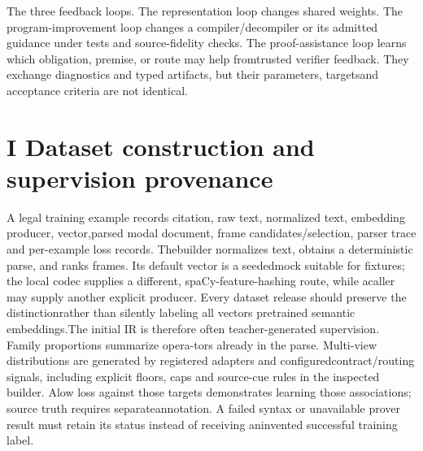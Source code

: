 \noindent
The three feedback loops. The representation loop changes shared weights. The program-\linebreak[4]
improvement loop changes a compiler/decompiler or its admitted guidance under tests and source-\linebreak[4]
fidelity checks. The proof-assistance loop learns which obligation, premise, or route may help from\linebreak[4]
trusted verifier feedback. They exchange diagnostics and typed artifacts, but their parameters, targets\linebreak[4]
and acceptance criteria are not identical.\par

\section*{I  Dataset construction and supervision provenance}
\noindent
A legal training example records citation, raw text, normalized text, embedding producer, vector,\linebreak[4]
parsed modal document, frame candidates/selection, parser trace and per-example loss records. The\linebreak[4]
builder normalizes text, obtains a deterministic parse, and ranks frames. Its default vector is a seeded\linebreak[4]
mock suitable for fixtures; the local codec supplies a different, spaCy-feature-hashing route, while a\linebreak[4]
caller may supply another explicit producer. Every dataset release should preserve the distinction\linebreak[4]
rather than silently labeling all vectors pretrained semantic embeddings.\linebreak[4]
The initial IR is therefore often teacher-generated supervision. Family proportions summarize opera-\linebreak[4]
tors already in the parse. Multi-view distributions are generated by registered adapters and configured\linebreak[4]
contract/routing signals, including explicit floors, caps and source-cue rules in the inspected builder. A\linebreak[4]
low loss against those targets demonstrates learning those associations; source truth requires separate\linebreak[4]
annotation. A failed syntax or unavailable prover result must retain its status instead of receiving an\linebreak[4]
invented successful training label.\par

